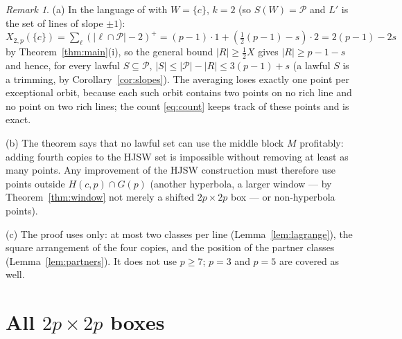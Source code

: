 \documentclass[11pt]{article}
\theoremstyle{remark}
\newtheorem{remark}[theorem]{Remark}
\newcommand{\Hc}{H(c,p)}
\newcommand{\Gp}{G(p)}
\newcommand{\Pset}{\mathcal{P}}
\begin{document}
\begin{remark}\label{rem:kns}
(a) In the language of \cite[Constr.~3.2, Rem.~3.4]{KNS25} with $W=\{c\}$, $k=2$ (so $S(W)=\Pset$ and $L'$ is the set of
lines of slope $\pm1$): $X_{2,p}(\{c\})=\sum_{\ell}(|\ell\cap\Pset|-2)^+=(p-1)\cdot1+(\tfrac12(p-1)-s)\cdot2=2(p-1)-2s$ by
Theorem~\ref{thm:main}(i), so the general bound $|R|\ge\tfrac12X$ gives $|R|\ge p-1-s$ and hence, for every lawful
$S\subseteq\Pset$, $|S|\le|\Pset|-|R|\le3(p-1)+s$ (a lawful $S$ is a trimming, by Corollary~\ref{cor:slopes}).  The
averaging loses exactly one point per exceptional orbit, because each such orbit contains two points on no rich line
and no point on two rich lines; the count \eqref{eq:count} keeps track of these points and is exact.

(b) The theorem says that no lawful set can use the middle block $M$ profitably: adding fourth copies to the HJSW
set is impossible without removing at least as many points.  Any improvement of the HJSW construction must therefore
use points outside $\Hc\cap\Gp$ (another hyperbola, a larger window --- by Theorem~\ref{thm:window} not merely a
shifted $2p\times2p$ box --- or non-hyperbola points).

(c) The proof uses only: at most two classes per line (Lemma~\ref{lem:lagrange}), the square arrangement of the four
copies, and the position of the partner classes (Lemma~\ref{lem:partners}).  It does not use $p\ge7$; $p=3$ and $p=5$
are covered as well.
\end{remark}

\section{All \texorpdfstring{$2p\times2p$}{2p by 2p} boxes}\label{sec:window}
\end{document}
